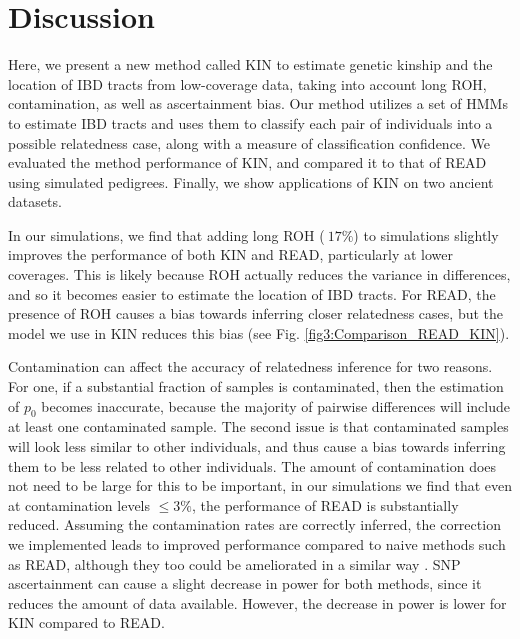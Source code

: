 \documentclass[12pt, letterpaper]{article}
\begin{document}
\section{Discussion}\label{discussion}
Here, we present a new method called KIN to estimate genetic kinship and the location of IBD tracts from low-coverage data, taking into account long ROH, contamination, as well as ascertainment bias. Our method utilizes a set of HMMs to estimate IBD tracts and uses them to classify each pair of individuals into a possible relatedness case, along with a measure of classification confidence. We evaluated the method performance of KIN, and compared it to that of READ using simulated pedigrees. Finally, we show applications of KIN on two ancient datasets.


In our simulations, we find that adding long ROH ($~17\%$) to simulations slightly improves the performance of  both KIN and READ, particularly at lower coverages. This is likely because ROH actually reduces the variance in differences, and so it becomes easier to estimate the location of IBD tracts. For READ, the presence of ROH causes a bias towards inferring closer relatedness cases, but the model we use in KIN reduces this bias (see Fig. \ref{fig3:Comparison_READ_KIN}). 

Contamination can affect the accuracy of relatedness inference for two reasons. For one, if a substantial fraction of samples is contaminated, then the estimation of $p_0$ becomes inaccurate, because the majority of pairwise differences will include at least one contaminated sample. The second issue is that contaminated samples will look less similar to other individuals, and thus cause a bias towards inferring them to be less related to other individuals. The amount of contamination does not need to be large for this to be important, in our simulations we find that even at contamination levels $\leq 3\%$, the performance of READ is substantially reduced.  Assuming the contamination rates are correctly inferred, the correction we implemented leads to improved performance compared to naive methods such as READ, although they too could be ameliorated in a similar way \cite{laurits_skov_genetic_nodate}. SNP ascertainment can cause a slight decrease in power for both  methods, since it reduces the amount of data available. However, the decrease in power is lower for KIN compared to READ.
\end{document}
